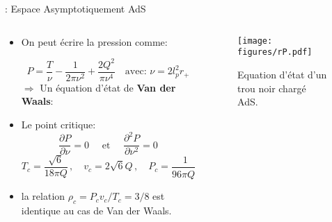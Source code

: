 \begin{frame}{\underline{\secname} : Espace Asymptotiquement AdS}

	\begin{columns}
		\begin{column}{0.6\linewidth}
\begin{itemize} \setlength\itemsep{0em}
	\item On peut écrire la pression comme:
	
	\begin{equation*}
	P=\frac{T}{\nu}-\frac{1}{2\pi \nu^2}+\frac{2Q^2}{\pi \nu^4}  \quad \text{avec: } \nu=2l_{p}^{2}r_{+}
	\end{equation*}
	\pause[2]
	$\Rightarrow$ Un équation d'état de \textbf{Van der Waals}:


\pause[3]
	\item	Le point critique:	
	\begin{equation*}
	\frac{\partial P}{\partial \nu}=0 \quad \text { et } \quad \frac{\partial^{2} P}{\partial \nu^{2}}=0
	\end{equation*}
			$$
			T_c=\frac{\sqrt{6}}{18\pi Q}\,,\quad \nonumber v_c=2\sqrt{6} Q\,,\quad \nonumber P_c=\frac{1}{96\pi Q^2}\,, 
			$$	
			
	\pause[4]				
\item la relation $\rho_c=P_c v_c/T_c=3/8$ est identique au cas de Van der Waals. 			
			
\end{itemize}
		\end{column}
		\begin{column}{0.4\linewidth}
			\pause[2]
			\begin{figure}[H]
				\begin{center}
			 
						\texttt{[image: figures/rP.pdf]}
					
					\caption{Equation d'état d'un trou noir chargé AdS.}
				\end{center}
			\end{figure}
			
		\end{column}
	\end{columns}

\end{frame}



